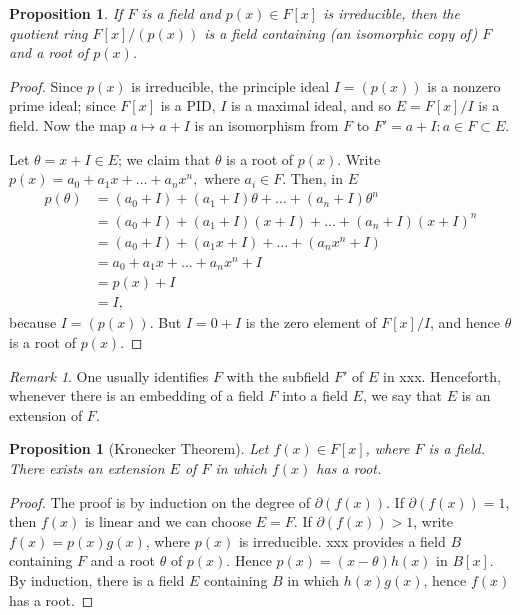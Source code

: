 \documentclass[draft]{article}
\newtheorem{prop}[thm]{Proposition}
\theoremstyle{definition}
\theoremstyle{remark}
\newtheorem{rem}{Remark}[section]
\begin{document}
			\begin{prop}
				If $F$ is a field and $p(x) \in F[x]$ is irreducible, then the quotient ring $F[x]/(p(x))$ is a field containing (an isomorphic copy of) $F$ and a root of $p(x)$.
			\end{prop}
			
			\begin{proof}
				Since $p(x)$ is irreducible, the principle ideal $I = (p(x))$ is a nonzero prime ideal; since $F[x]$ is a PID, $I$ is a maximal ideal, and so $E = F[x]/I$ is a field. Now the map $a \mapsto a + I$ is an isomorphism from $F$ to $F' = {a + I : a \in F} \subset E$.\par
				Let $\theta = x + I \in E$; we claim that $\theta$ is a root of $p(x)$. Write $p(x) = a_0 + a_1x + \dots + a_nx^n, \text{ where } a_i \in F$. Then, in $E$
				\begin{align*}
					p(\theta) &= (a_0 + I) + (a_1 + I)\theta + \dots + (a_n + I)\theta^n\\
					&= (a_0 + I) + (a_1 + I)(x + I) + \dots + (a_n + I)(x + I)^n\\
					&= (a_0 + I) + (a_1x + I) + \dots + (a_nx^n + I)\\
					&= a_0 + a_1x + \dots + a_nx^n + I\\
					&= p(x) + I\\
					&= I,
				\end{align*}
				because $I = (p(x))$. But $I = 0 + I$ is the zero element of $F[x]/I$, and hence $\theta$ is a root of $p(x)$.
			\end{proof}
			
			\begin{rem}
			    One usually identifies $F$ with the subfield $F'$ of $E$ in xxx. Henceforth, whenever there is an embedding of a field $F$ into a field $E$, we say that $E$ is an extension of $F$.
			\end{rem}
			
			\begin{prop}[Kronecker Theorem]
				Let $f(x) \in F[x]$, where $F$ is a field. There exists an extension $E$ of $F$ in which $f(x)$ has a root.
			\end{prop}
			
			\begin{proof}
				The proof is by induction on the degree of $\partial(f(x))$. If $\partial(f(x)) = 1$, then $f(x)$ is linear and we can choose $E = F$. If $\partial(f(x)) > 1$, write $f(x) = p(x)g(x)$, where $p(x)$ is irreducible. xxx provides a field $B$ containing $F$ and a root $\theta$ of $p(x)$. Hence $p(x) = (x - \theta)h(x)$ in $B[x]$. By induction, there is a field $E$ containing $B$ in which $h(x)g(x)$, hence $f(x)$ has a root.
			\end{proof}
			
\end{document}
